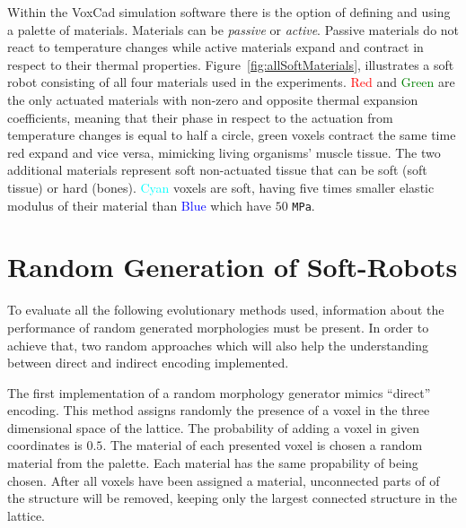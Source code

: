 Within the VoxCad simulation software there is the option of defining and using a palette of materials. Materials can be \emph{passive} or \emph{active}. Passive materials do not react to temperature changes while active materials expand and contract in respect to their thermal properties. Figure~\ref{fig:allSoftMaterials}, illustrates a soft robot consisting of all four materials used in the experiments. \textcolor{Red}{Red} and \textcolor{Green}{Green} are the only actuated materials with non-zero and opposite thermal expansion coefficients, meaning that their phase in respect to the actuation from temperature changes is equal to half a circle, green voxels contract the same time red expand and vice versa, mimicking living organisms' muscle tissue. The two additional materials represent soft non-actuated tissue that can be soft (soft tissue) or hard (bones). \textcolor{Cyan}{Cyan} voxels are soft, having five times smaller elastic modulus of their material than \textcolor{Blue}{Blue} which have $50$ \texttt{MPa}.


\section{Random Generation of Soft-Robots}

To evaluate all the following evolutionary methods used, information about the performance of random generated morphologies must be present. In order to achieve that, two random approaches which will also help the understanding between direct and indirect encoding implemented. 

The first implementation of a random morphology generator mimics ``direct'' encoding. This method assigns randomly the presence of a voxel in the three dimensional space of the lattice. The probability of adding a voxel in given coordinates is $0.5$. The material of each presented voxel is chosen a random material from the palette. Each material has the same propability of being chosen. After all voxels have been assigned a material, unconnected parts of of the structure will be removed, keeping only the largest connected structure in the lattice.


